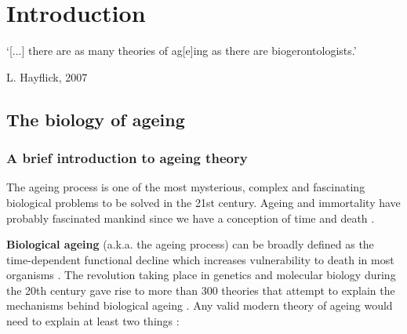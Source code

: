 
\chapter{Introduction}  \label{c:1} %

\ifpdf
    \graphicspath{{Chapter1/Figs/Raster/}{Chapter1/Figs/PDF/}{Chapter1/Figs/}}
\else
    \graphicspath{{Chapter1/Figs/Vector/}{Chapter1/Figs/}}
\fi



\epigraph{`[...] there are as many theories of ag[e]ing as there are biogerontologists.'}{L. Hayflick, 2007 \cite{Hayflick2007}}

\section{The biology of ageing} %

\subsection{A brief introduction to ageing theory}

The ageing process is one of the most mysterious, complex and fascinating biological problems to be solved in the 21st century. Ageing and immortality have probably fascinated mankind since we have a conception of time and death \cite{Renfrew2016}. 

\bigskip

\textbf{Biological ageing} (a.k.a. the ageing process) can be broadly defined as the time-dependent functional decline which increases vulnerability to death in most organisms \cite{Lopez-Otin2013}. The revolution taking place in genetics and molecular biology during the 20th century gave rise to more than 300 theories that attempt to explain the mechanisms behind biological ageing \cite{Medvedev1990}. Any valid modern theory of ageing would need to explain at least two things \cite{Medvedev1990}:

